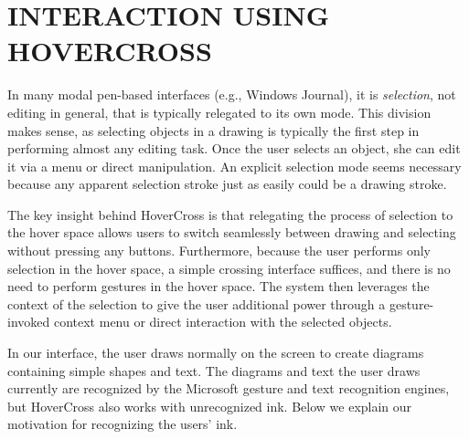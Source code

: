 \documentclass{article}
\begin{document}



\section{INTERACTION USING HOVERCROSS}

In many modal pen-based interfaces (e.g., Windows Journal), it is
\textit{selection}, not editing in general, that is typically
relegated to its own mode.  This division makes sense, as selecting
objects in a drawing is typically the first step in performing almost
any editing task.  Once the user selects an object, she can edit it
via a menu or direct manipulation.  An explicit selection mode seems
necessary because any apparent selection stroke just as easily could
be a drawing stroke.

The key insight behind HoverCross is that relegating the process of
selection to the hover space allows users to switch seamlessly between
drawing and selecting without pressing any buttons.  Furthermore,
because the user performs only selection in the hover space, a simple
crossing interface suffices, and there is no need to perform gestures
in the hover space.  The system then leverages the context of the
selection to give the user additional power through a
gesture-invoked context menu or direct interaction with the selected
objects.

In our interface, the user draws normally on the screen to create
diagrams containing simple shapes and text.  The diagrams and text the
user draws currently are recognized by the Microsoft gesture and text
recognition engines, but HoverCross also works with unrecognized ink.
Below we explain our motivation for recognizing the users' ink.
\end{document}
